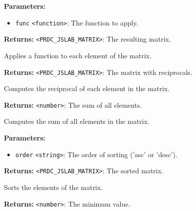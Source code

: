 \documentclass[12pt,a4paper]{article}
\begin{document}
\noindent \textbf{Parameters:}
\begin{itemize}
  \item \texttt{func} \texttt{<function>}: The function to apply.
\end{itemize}

\noindent \textbf{Returns:} \texttt{<PRDC\_JSLAB\_MATRIX>}: The resulting matrix.

\noindent Applies a function to each element of the matrix.

\vspace{5mm}
\noindent {}


\noindent \textbf{Returns:} \texttt{<PRDC\_JSLAB\_MATRIX>}: The matrix with reciprocals.

\noindent Computes the reciprocal of each element in the matrix.

\vspace{5mm}
\noindent {}


\noindent \textbf{Returns:} \texttt{<number>}: The sum of all elements.

\noindent Computes the sum of all elements in the matrix.

\vspace{5mm}
\noindent {}


\noindent \textbf{Parameters:}
\begin{itemize}
  \item \texttt{order} \texttt{<string>}: The order of sorting ('asc' or 'desc').
\end{itemize}

\noindent \textbf{Returns:} \texttt{<PRDC\_JSLAB\_MATRIX>}: The sorted matrix.

\noindent Sorts the elements of the matrix.

\vspace{5mm}
\noindent {}


\noindent \textbf{Returns:} \texttt{<number>}: The minimum value.
\end{document}
